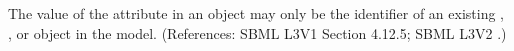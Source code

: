 The value of the attribute  in an \EventAssignment object
may only be the identifier of an existing \Compartment, \Species,
\Parameter or \SpeciesReference object in the model.  (References: SBML L3V1 Section 4.12.5; SBML
L3V2 .)
